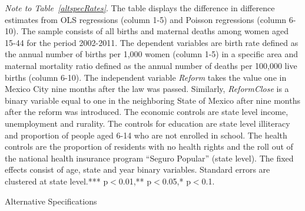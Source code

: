 \documentclass[a4paper, 11pt]{article}
\begin{document}
\begin{spacing}{1.4}
\begin{table}
\begin{threeparttable}
    \begin{tablenotes} 
      \footnotesize	\item \textit{Note to Table~\ref{altspecRates}}. The table displays the difference in difference estimates from OLS regressions (column 1-5) and Poisson regressions (column 6-10). The sample consists of all births and maternal deaths among women aged 15-44 for the period 2002-2011. The dependent variables are birth rate defined as the annual number of births per 1,000 women (column 1-5) in a specific area and maternal mortality ratio defined as the annual number of deaths per 100,000 live births (column 6-10). The independent variable \textit{Reform} takes the value one in Mexico City nine months after the law was passed. Similarly, \textit{ReformClose} is a binary variable equal to one in the neighboring State of Mexico after nine months after the reform was introduced. The economic controls are state level income, unemployment and rurality. The controls for education are state level illiteracy and proportion of people aged 6-14 who are not enrolled in school. The health controls are the proportion of residents with no health rights and the roll out of the national health insurance program ``Seguro Popular'' (state level). The fixed effects consist of age, state and year binary variables. Standard errors are clustered at state level.*** p$<$0.01,** p$<$0.05,* p$<$0.1.
      
       
    \end{tablenotes} 
  \end{threeparttable}
\end{table} 



\begin{table}\centering \caption{Alternative Specifications}\label{OLS_levels}
	\begin{threeparttable}
	{ \footnotesize	}
	 
		
	

\end{threeparttable}
\end{table}
\end{spacing}
\end{document}
